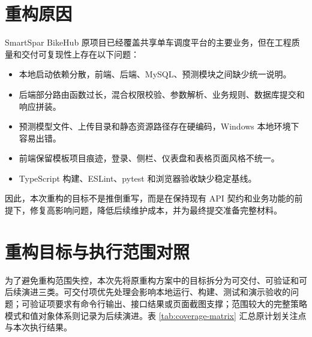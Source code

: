 
\section{重构原因}

SmartSpar BikeHub 原项目已经覆盖共享单车调度平台的主要业务，但在工程质量和交付可复现性上存在以下问题：

\begin{itemize}
  \item 本地启动依赖分散，前端、后端、MySQL、预测模块之间缺少统一说明。
  \item 后端部分路由函数过长，混合权限校验、参数解析、业务规则、数据库提交和响应拼装。
  \item 预测模型文件、上传目录和静态资源路径存在硬编码，Windows 本地环境下容易出错。
  \item 前端保留模板项目痕迹，登录、侧栏、仪表盘和表格页面风格不统一。
  \item TypeScript 构建、ESLint、pytest 和浏览器验收缺少稳定基线。
\end{itemize}

因此，本次重构的目标不是推倒重写，而是在保持现有 API 契约和业务功能的前提下，修复高影响问题，降低后续维护成本，并为最终提交准备完整材料。

\section{重构目标与执行范围对照}

为了避免重构范围失控，本次先将原重构方案中的目标拆分为可交付、可验证和可后续演进三类。可交付项优先处理会影响本地运行、构建、测试和演示验收的问题；可验证项要求有命令行输出、接口结果或页面截图支撑；范围较大的完整策略模式和值对象体系则记录为后续演进。表 \ref{tab:coverage-matrix} 汇总原计划关注点与本次执行结果。

